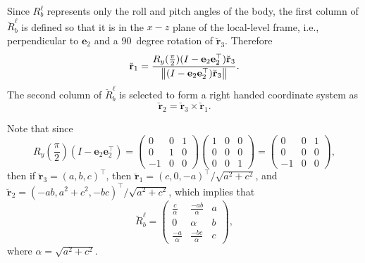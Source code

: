 Since $R_b^\ell$ represents only the roll and pitch angles of the body, the first column of $\breve{R}_b^\ell$ is defined so that it is in the $x-z$ plane of the local-level frame, i.e., perpendicular to $\mathbf{e}_2$ and a $90$~degree rotation of $\breve{\mathbf{r}}_{3}$.  Therefore
\[
\breve{\mathbf{r}}_{1} = \frac{R_y(\frac{\pi}{2})(I-\mathbf{e}_2\mathbf{e}_2^\top)\breve{\mathbf{r}}_{3}}{\left\|(I-\mathbf{e}_2\mathbf{e}_2^\top)\breve{\mathbf{r}}_{3}\right\|}.
\]
The second column of $\breve{R}_b^\ell$ is selected to form a right handed coordinate system as
\[
\breve{\mathbf{r}}_{2} = \breve{\mathbf{r}}_{3} \times \breve{\mathbf{r}}_{1}.
\]

Note that since
\[
R_y(\frac{\pi}{2})(I-\mathbf{e}_2\mathbf{e}_2^\top) = \begin{pmatrix}0 & 0 & 1 \\ 0 & 1 & 0 \\ -1 & 0 & 0\end{pmatrix}\begin{pmatrix}1 & 0 & 0 \\ 0 & 0 & 0 \\ 0 & 0 & 1\end{pmatrix} = \begin{pmatrix} 0 & 0 & 1 \\ 0 & 0 & 0 \\ -1 & 0 & 0 \end{pmatrix},
\]
then if $\breve{\mathbf{r}}_{3} = (a, b, c)^\top$, then $\breve{\mathbf{r}}_{1} = (c, 0, -a)^\top/\sqrt{a^2+c^2}$, and $\breve{\mathbf{r}}_{2} = (-ab, a^2+c^2, -bc)^\top/\sqrt{a^2+c^2}$, which implies that 
\[
\breve{R}_b^\ell = \begin{pmatrix} \frac{c}{\alpha} & \frac{-ab}{\alpha} & a \\
                               0 & \alpha & b \\
                               \frac{-a}{\alpha} & \frac{-bc}{\alpha} & c
               \end{pmatrix},
\] 
where $\alpha = \sqrt{a^2+c^2}$.


